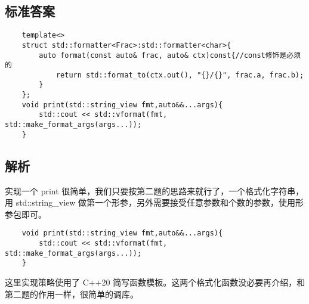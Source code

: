 

\subsection{标准答案}

\begin{verbatim}
    template<>
    struct std::formatter<Frac>:std::formatter<char>{
        auto format(const auto& frac, auto& ctx)const{//const修饰是必须的
            return std::format_to(ctx.out(), "{}/{}", frac.a, frac.b);
        }
    };
    void print(std::string_view fmt,auto&&...args){
        std::cout << std::vformat(fmt, std::make_format_args(args...));
    }
\end{verbatim}

\subsection{解析}

实现一个 print 很简单，我们只要按第二题的思路来就行了，一个格式化字符串，用 std::string\_view 做第一个形参，另外需要接受任意参数和个数的参数，使用形参包即可。

\begin{verbatim}
    void print(std::string_view fmt,auto&&...args){
        std::cout << std::vformat(fmt, std::make_format_args(args...));
    }
\end{verbatim}

这里实现策略使用了 C++20 简写函数模板。这两个格式化函数没必要再介绍，和第二题的作用一样，很简单的调库。

\clearpage
